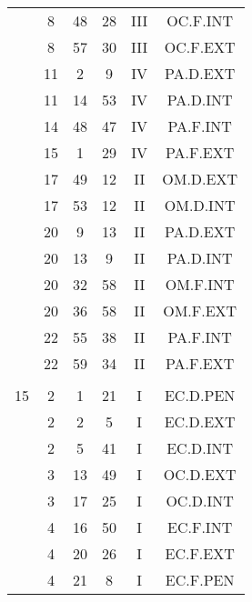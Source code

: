 \documentclass[12pt, a4paper]{article}
\begin{document}
\begin{multicols}{3}
{\begin{tabular}{c c c c c c}
	 	 	 	 & 8 & 48 & 28 & III & OC.F.INT\\%
	 	 	 	 & 8 & 57 & 30 & III & OC.F.EXT\\%
	 	 	 	 & 11 & 2 & 9 & IV & PA.D.EXT\\%
	 	 	 	 & 11 & 14 & 53 & IV & PA.D.INT\\%
	 	 	 	 & 14 & 48 & 47 & IV & PA.F.INT\\%
	 	 	 	 & 15 & 1 & 29 & IV & PA.F.EXT\\%
	 	 	 	 & 17 & 49 & 12 & II & OM.D.EXT\\%
	 	 	 	 & 17 & 53 & 12 & II & OM.D.INT\\%
	 	 	 	 & 20 & 9 & 13 & II & PA.D.EXT\\%
	 	 	 	 & 20 & 13 & 9 & II & PA.D.INT\\%
	 	 	 	 & 20 & 32 & 58 & II & OM.F.INT\\%
	 	 	 	 & 20 & 36 & 58 & II & OM.F.EXT\\%
	 	 	 	 & 22 & 55 & 38 & II & PA.F.INT\\%
	 	 	 	 & 22 & 59 & 34 & II & PA.F.EXT\\%
	 	 	 	 & & & & & \\%
	 	 	 	15 & 2 & 1 & 21 & I & EC.D.PEN\\%
	 	 	 	 & 2 & 2 & 5 & I & EC.D.EXT\\%
	 	 	 	 & 2 & 5 & 41 & I & EC.D.INT\\%
	 	 	 	 & 3 & 13 & 49 & I & OC.D.EXT\\%
	 	 	 	 & 3 & 17 & 25 & I & OC.D.INT\\%
	 	 	 	 & 4 & 16 & 50 & I & EC.F.INT\\%
	 	 	 	 & 4 & 20 & 26 & I & EC.F.EXT\\%
	 	 	 	 & 4 & 21 & 8 & I & EC.F.PEN\\%

\end{tabular}}
\end{multicols}
\end{document}
